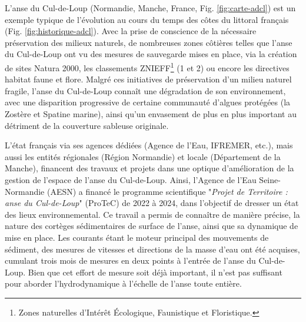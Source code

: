 \documentclass[10pt,a4paper,titlepage]{article}
\begin{document}
    L'anse du Cul-de-Loup (Normandie, Manche, France, Fig. \ref{fig:carte-adcl}) est un exemple typique de l'évolution au cours du temps des côtes du littoral français (Fig. \ref{fig:historique-adcl}). Avec la prise de conscience de la nécessaire préservation des milieux naturels, de nombreuses zones côtières telles que l'anse du Cul-de-Loup ont vu des mesures de sauvegarde mises en place, via la création de sites Natura 2000, les classements ZNIEFF\footnote{Zones naturelles d’Intérêt Écologique, Faunistique et Floristique.} (1 et 2) ou encore les directives habitat faune et flore. Malgré ces initiatives de préservation d'un milieu naturel fragile, l'anse du Cul-de-Loup connaît une dégradation de son environnement, avec une disparition progressive de certaine communauté d'algues protégées (la Zostère et Spatine marine), ainsi qu'un envasement de plus en plus important au détriment de la couverture sableuse originale.

    L'état français via ses agences dédiées (Agence de l'Eau, IFREMER, etc.), mais aussi les entités régionales (Région Normandie) et locale (Département de la Manche), financent des travaux et projets dans une optique d'amélioration de la gestion de l'espace de l'anse du Cul-de-Loup. Ainsi, l'Agence de l'Eau Seine-Normandie (AESN) a financé le programme scientifique "\textit{Projet de Territoire : anse du Cul-de-Loup}" (ProTeC) de 2022 à 2024, dans l'objectif de dresser un état des lieux environnemental. Ce travail a permis de connaître de manière précise, la nature des cortèges sédimentaires de surface de l'anse, ainsi que sa dynamique de mise en place. Les courants étant le moteur principal des mouvements de sédiment, des mesures de vitesses et directions de la masse d'eau ont été acquises, cumulant trois mois de mesures en deux points à l'entrée de l'anse du Cul-de-Loup. Bien que cet effort de mesure soit déjà important, il n'est pas suffisant pour aborder l'hydrodynamique à l'échelle de l'anse toute entière.
\end{document}
